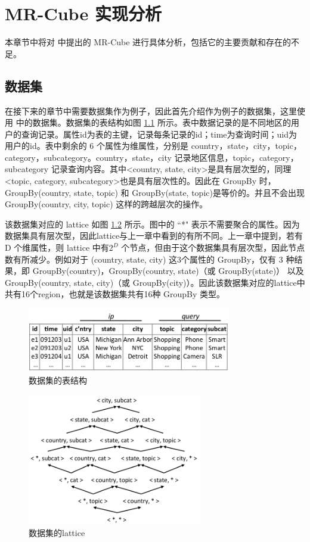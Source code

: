 \chapter{MR-Cube 实现分析}

本章节中将对 \cite{nandi2011distributed} 中提出的 MR-Cube 进行具体分析，包括它的主要贡献和存在的不足。

\section{数据集}

在接下来的章节中需要数据集作为例子，因此首先介绍作为例子的数据集，这里使用\cite{nandi2011distributed}  中的数据集。数据集的表结构如图 \ref{dataset_table} 所示。表中数据记录的是不同地区的用户的查询记录。属性id为表的主键，记录每条记录的id；time为查询时间；uid为用户的id。表中剩余的 6 个属性为维属性，分别是 country，state，city，topic，category，subcategory。country，state，city 记录地区信息，topic，category，subcategory 记录查询内容。其中\textless country, state, city\textgreater 是具有层次型的，同理\textless topic, category, subcategory\textgreater 也是具有层次性的。因此在 GroupBy 时，GroupBy(country, state, topic) 和 GroupBy(state, topic)是等价的。并且不会出现 GroupBy(country, city, topic) 这样的跨越层次的操作。

该数据集对应的 lattice 如图 \ref{dataset_lattice} 所示。图中的 ``*" 表示不需要聚合的属性。因为数据集具有层次型，因此lattice与上一章中看到的有所不同。上一章中提到，若有 D 个维属性，则 lattice 中有${2}^{D}$ 个节点，但由于这个数据集具有层次型，因此节点数有所减少。例如对于 (country, state, city) 这3个属性的 GroupBy，仅有 3 种结果，即 GroupBy(country)，GroupBy(country, state)（或 GroupBy(state)） 以及 GroupBy(country, state, city)（或 GroupBy(city)）。因此该数据集对应的lattice中共有16个region，也就是该数据集共有16种 GroupBy 类型。


\begin{figure}[!htb]
\centering\includegraphics[width=3.5in]{picture/ch_datacube_mr/dataset_table} 
\caption{数据集的表结构}\label{dataset_table} 
\end{figure} 

\begin{figure}[!htb]
\centering\includegraphics[width=3in]{picture/ch_datacube_mr/dataset_lattice} 
\caption{数据集的lattice}\label{dataset_lattice} 
\end{figure} 

